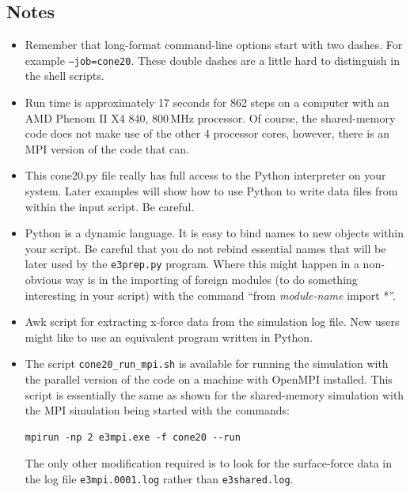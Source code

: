 \noindent
\topbar

\bottombar

\subsection{Notes}
\begin{itemize}
\item Remember that long-format command-line options start with two dashes.
      For example \texttt{--job=cone20}.
      These double dashes are a little hard to distinguish in the shell
      scripts.

\item Run time is approximately 17 seconds for 862 steps on a computer with 
      an AMD Phenom II X4 840, 800\,MHz processor.
      Of course, the shared-memory code does not make use of the other 4 processor cores,
      however, there is an MPI version of the code that can.

\item This cone20.py file really has full access to the Python interpreter
      on your system.  Later examples will show how to use Python to write
      data files from within the input script.  Be careful.

\item Python is a dynamic language.
      It is easy to bind names to new objects within your script.
      Be careful that you do not rebind essential names that will be
      later used by the \texttt{e3prep.py} program.
      Where this might happen in a non-obvious way is in the importing
      of foreign modules (to do something interesting in your script)
      with the command ``from \textit{module-name} import *''.

\item Awk script for extracting x-force data from the simulation log file.
      New users might like to use an equivalent program written in Python.

\item The script \texttt{cone20\_run\_mpi.sh} is available for running the simulation
  with the parallel version of the code on a machine with OpenMPI installed.
  This script is essentially the same as shown for the shared-memory simulation
  with the MPI simulation being started with the commands:
\begin{verbatim}
mpirun -np 2 e3mpi.exe -f cone20 --run
\end{verbatim}
  The only other modification required is to look for the surface-force data in the
  log file \texttt{e3mpi.0001.log} rather than \texttt{e3shared.log}.

\end{itemize}

